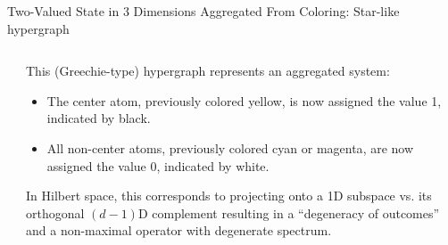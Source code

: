 \documentclass{beamer}
\begin{document}
\begin{frame}{Two-Valued State in 3 Dimensions Aggregated From Coloring: Star-like hypergraph}
\begin{columns}[c]
\begin{column}{0.45\textwidth}
{
            }
        \end{column}
        \begin{column}{0.55\textwidth}
            This (Greechie-type) hypergraph represents an aggregated system:
            \begin{itemize} [<+->] %
                \item The center atom, previously colored \alert{\color{yellow}yellow}, is now assigned the value 1, indicated by \alert{black}.
                \item All \alert{non-center} atoms, previously colored \alert{\color{cyan}cyan} or \alert{\color{magenta}magenta},
are now assigned the value $0$, indicated by \alert{white}.
            \end{itemize}
            In Hilbert space, this corresponds to projecting onto a 1D subspace vs. its orthogonal $(d-1)$D complement resulting in
a ``degeneracy of outcomes'' and a non-maximal operator with degenerate spectrum.
        \end{column}
    \end{columns}
\end{frame}
\end{document}
